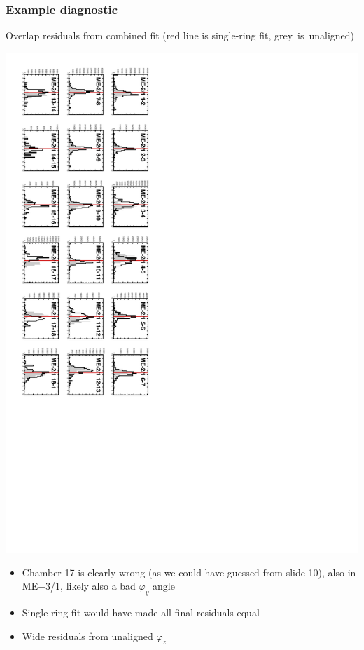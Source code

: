 \documentclass[compress]{beamer}
\begin{document}
\begin{frame}
\frametitle{Example diagnostic}
\small

\vspace{0.5 cm}
\hspace{-0.5 cm} Overlap residuals from combined fit (red line is single-ring fit, \mbox{grey is unaligned)\hspace{-1 cm}}

\vfill
\includegraphics[height=\linewidth, angle=90]{final_checkresids_half.pdf}

\vfill
\begin{itemize}
\item Chamber 17 is clearly wrong (as we could have guessed from slide 10), also in ME$-$3/1, likely also a bad $\varphi_y$ angle
\item Single-ring fit would have made all final residuals equal

\vspace{0.5 cm}
\item Wide residuals from unaligned $\varphi_z$
\end{itemize}
\end{frame}
\end{document}
